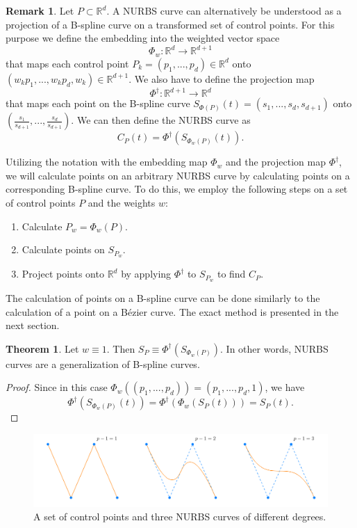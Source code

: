 \documentclass[a4paper, 11pt]{report}
\theoremstyle{definition}
\newtheorem{theorem}[definition]{Theorem}
\newtheorem*{remark}{Remark}
\begin{document}
	\begin{remark}
		Let $P \subset \mathbb{R}^d$. A NURBS curve can alternatively be understood as a projection of a B-spline curve on a transformed set of control points. For this purpose we define the embedding into the weighted vector space
			$$\Phi_w: \mathbb{R}^d \rightarrow \mathbb{R}^{d+1}$$
		that maps each control point $P_k = (p_1, ..., p_d) \in \mathbb{R}^d$ onto $(w_k p_1, ..., w_k p_d, w_k) \in \mathbb{R}^{d+1}$.
		We also have to define the projection map
			$$\Phi^\dagger: \mathbb{R}^{d+1} \rightarrow \mathbb{R}^d$$ 
		that maps each point on the B-spline curve $S_{\Phi(P)}(t) = (s_1, ..., s_d, s_{d+1})$ onto $(\frac{s_1}{s_{d+1}}, ..., \frac{s_d}{s_{d+1}})$.
		We can then define the NURBS curve as
				$$ C_P(t) = \Phi^\dagger(S_{\Phi_w(P)}(t)).$$ 
	\end{remark}

	Utilizing the notation with the embedding map $\Phi_w$ and the projection map $\Phi^\dagger$, we will calculate points on an arbitrary NURBS curve by calculating points on a corresponding B-spline curve. To do this, we employ the following steps on a set of control points $P$ and the weights $w$:
	\begin{enumerate}
		\item Calculate $P_w = \Phi_w(P)$.
		\item Calculate points on $S_{P_w}$.
		\item Project points onto $\mathbb{R}^d$ by applying $\Phi^\dagger$ to $S_{P_w}$ to find $C_P$.
	\end{enumerate}
	The calculation of points on a B-spline curve can be done similarly to the calculation of a point on a Bézier curve. The exact method is presented in the next section.

	\begin{theorem}
		Let $w \equiv 1$. Then $S_P \equiv \Phi^\dagger(S_{\Phi_w(P)})$. In other words, NURBS curves are a generalization of B-spline curves.
	\end{theorem}
	\begin{proof}
		Since in this case $\Phi_w((p_1, ..., p_d)) = (p_1, ..., p_d, 1)$, we have
			$$\Phi^\dagger(S_{\Phi_w(P)}(t)) = \Phi^\dagger(\Phi_w(S_P(t))) = S_P(t).$$
	\end{proof}

	\begin{figure}[H]
		\centering
		\includegraphics[width=\textwidth]{../tec/nurbsCurve/nurbsCurve.png}
		\caption{A set of control points and three NURBS curves of different degrees.}
		\label{fig:nurbscurve}
	\end{figure}
\end{document}
